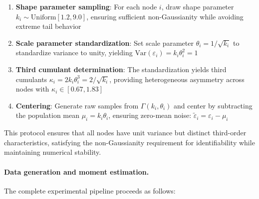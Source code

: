 \documentclass[11pt,a4paper]{article}
\numberwithin{equation}{section}
\begin{document}
\begin{enumerate}[label=(\roman*)]
\item \textbf{Shape parameter sampling}: For each node $i$, draw shape parameter $k_i \sim \text{Uniform}[1.2, 9.0]$, ensuring sufficient non-Gaussianity while avoiding extreme tail behavior

\item \textbf{Scale parameter standardization}: Set scale parameter $\theta_i = 1/\sqrt{k_i}$ to standardize variance to unity, yielding $\text{Var}(\varepsilon_i) = k_i \theta_i^2 = 1$

\item \textbf{Third cumulant determination}: The standardization yields third cumulants $\kappa_i = 2k_i\theta_i^3 = 2/\sqrt{k_i}$, providing heterogeneous asymmetry across nodes with $\kappa_i \in [0.67, 1.83]$

\item \textbf{Centering}: Generate raw samples from $\Gamma(k_i, \theta_i)$ and center by subtracting the population mean $\mu_i = k_i\theta_i$, ensuring zero-mean noise: $\tilde{\varepsilon}_i = \varepsilon_i - \mu_i$
\end{enumerate}

This protocol ensures that all nodes have unit variance but distinct third-order characteristics, satisfying the non-Gaussianity requirement for identifiability while maintaining numerical stability.

\paragraph{Data generation and moment estimation.} The complete experimental pipeline proceeds as follows:
\end{document}
